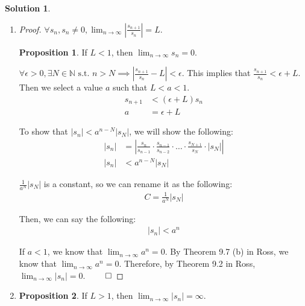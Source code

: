 \documentclass[12pt]{article}
\theoremstyle{definition} %
\newtheorem{solution}{Solution}
\newtheorem*{proposition}{Proposition}
\theoremstyle{plain} %
\begin{document}
\begin{solution}
    \begin{enumerate}
        \item \begin{proof}
        $\forall s_n, s_n \neq 0, \lim_{n \to \infty} \left| \frac{s_{n+1}}{s_n} \right| = L.$
    
        \begin{proposition}
             If $L < 1$, then $\lim_{n \to \infty} s_n = 0.$
        \end{proposition}
    
        $\forall \epsilon > 0, \exists N \in \mathbb{N} \text{ s.t. } n > N \implies \left| \frac{s_{n+1}}{s_n} - L \right| < \epsilon.$
        This implies that $\frac{s_{n+1}}{s_n} < \epsilon + L.$ Then we select a value $a$ such that $L < a < 1.$
        \begin{align}
            s_{n+1} &< (\epsilon + L) s_n \tag{1} \\
            a &= \epsilon + L \tag{2}
        \end{align}
    
        To show that $|s_n| < a^{n-N} |s_N|$, we will show the following:
        \begin{align}
            |s_n| &= \left| \frac{s_n}{s_{n-1}} \cdot \frac{s_{n-1}}{s_{n-2}} \cdot \dots \cdot \frac{s_{N+1}}{s_N} \cdot |s_N| \right| \tag{4} \\
            |s_n| &< a^{n-N} |s_N| \tag{5}
        \end{align}
    
        $\frac{1}{a^N} |s_N|$ is a constant, so we can rename it as the following:
        \begin{align}
            C = \frac{1}{a^N} |s_N| \tag{6}
        \end{align}
    
        Then, we can say the following:
        \begin{align}
            |s_n| < a^n \tag{7}
        \end{align}
    
        If $a < 1$, we know that $\lim_{n \to \infty} a^n = 0.$ By Theorem 9.7 (b) in Ross, we know that $\lim_{n \to \infty} a^n = 0.$
        Therefore, by Theorem 9.2 in Ross, $\lim_{n \to \infty} |s_n| = 0.$ $\qed$
    \end{proof}
\item    \begin{proposition}
         If $L > 1$, then $\lim_{n \to \infty} |s_n| = \infty.$
    \end{proposition}
    

\end{enumerate}
\end{solution}
\end{document}
